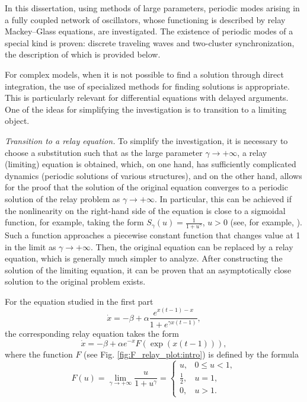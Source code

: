 In this dissertation, using methods of large parameters, periodic modes arising in a fully coupled network of oscillators, whose functioning is described by relay Mackey--Glass equations, are investigated. The existence of periodic modes of a special kind is proven: discrete traveling waves and two-cluster synchronization, the description of which is provided below.

{\methods} For complex models, when it is not possible to find a solution through direct integration, the use of specialized methods for finding solutions is appropriate. This is particularly relevant for differential equations with delayed arguments. One of the ideas for simplifying the investigation is to transition to a limiting object.

\textit{Transition to a relay equation.} To simplify the investigation, it is necessary to choose a substitution such that as the large parameter $\gamma \to +\infty$, a relay (limiting) equation is obtained, which, on one hand, has sufficiently complicated dynamics (periodic solutions of various structures), and on the other hand, allows for the proof that the solution of the original equation converges to a periodic solution of the relay problem as $\gamma \to +\infty$. In particular, this can be achieved if the nonlinearity on the right-hand side of the equation is close to a sigmoidal function, for example, taking the form $S_\gamma(u) = \frac{1}{1 + u^\gamma}$, $u > 0$ (see, for example, \cite{Preobrazhenskaya2020, Glyzin2017, Krisztin2020, Bartha2021}). Such a function approaches a piecewise constant function that changes value at 1 in the limit as $\gamma \to +\infty$. Then, the original equation can be replaced by a relay equation, which is generally much simpler to analyze. After constructing the solution of the limiting equation, it can be proven that an asymptotically close solution to the original problem exists.

For the equation studied in the first part
\begin{equation}
\label{eq:intro:MG_norm1}
	\dot{x}=-\beta+\alpha\frac{e^{x(t-1)-x}}{1+e^{\gamma x(t-1)}},
\end{equation}
the corresponding relay equation takes the form
\[
\dot{x}=-\beta + \alpha e^{-x} F(\exp({x(t-1)})),
\]
where the function $F$ (see Fig. \ref{fig:F_relay_plot:intro}) is defined by the formula
\begin{equation}
	\label{eq:intro:F_relay}
	F(u)=\lim\limits_{\gamma\to +\infty}\frac{u}{1+u^{\gamma}} = 
	\begin{cases}
		u, & 0 \leq u < 1,\\
		\frac{1}{2}, & u = 1,\\
		0, & u > 1.
	\end{cases}
\end{equation}


